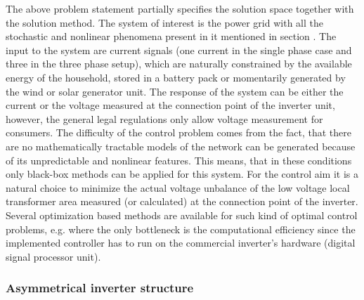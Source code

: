     The above problem statement partially specifies the solution space together with the solution method. The system of interest is the power grid with all the stochastic and nonlinear phenomena present in it mentioned in section . The input to the system are current signals (one current in the single phase case and three in the three phase setup), which are naturally constrained by the available energy of the household, stored in a battery pack or momentarily generated by the wind or solar generator unit. The response of the system can be either the current or the voltage measured at the connection point of the inverter unit, however, the general legal regulations only allow voltage measurement for consumers. The difficulty of the control problem comes from the fact, that there are no mathematically tractable models of the network can be generated because of its unpredictable and nonlinear features. This means, that in these conditions only black-box methods can be applied for this system.
    For the control aim it is a natural choice to minimize the actual voltage unbalance of the low voltage local transformer area measured (or calculated) at the connection point of the inverter. Several optimization based methods are available for such kind of optimal control problems, e.g. \cite{gorbe2012reduction} where the only bottleneck is the computational efficiency since the implemented controller has to run on the commercial inverter's hardware (digital signal processor unit).

    \subsubsection{Asymmetrical inverter structure}\label{VUB:sec:Inverter}

